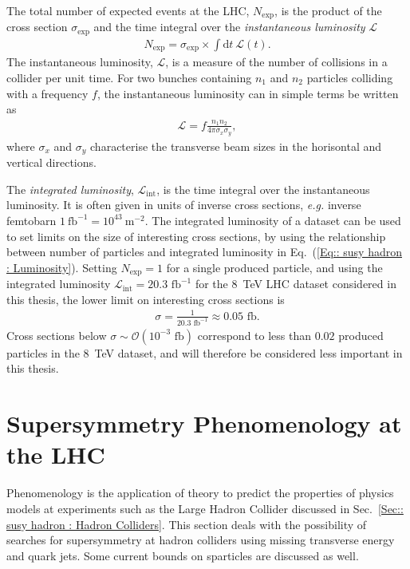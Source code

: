 \documentclass[twoside,english]{uiofysmaster}
\begin{document}
{The total number of expected events at the LHC, $N_{\mathrm{exp}}$, is the product of the cross section $\sigma_{\mathrm{exp}}$ and the time integral over the \textit{instantaneous luminosity} $\mathscr{L}$
\begin{align}\label{Eq:: susy hadron : Luminosity}
N_{\mathrm{exp}} = \sigma_{\mathrm{exp}} \times \int \mathrm{d}t~ \mathscr{L}(t).
\end{align}
The instantaneous luminosity, $\mathscr{L}$, is a measure of the number of collisions in a collider per unit time. For two bunches containing $n_1$ and $n_2$ particles colliding with a frequency $f$, the instantaneous luminosity can in simple terms be written as
\begin{align}
\mathscr{L} = f \frac{n_1 n_2}{4 \pi \sigma_x \sigma_y},
\end{align}
where $\sigma_x$ and $\sigma_y$ characterise the transverse beam sizes in the horisontal and vertical directions.

The \textit{integrated luminosity}, $\mathscr{L}_{\mathrm{int}}$, is the time integral over the instantaneous luminosity. It is often given in units of inverse cross sections, \textit{e.g.} inverse femtobarn $1~\mathrm{fb}^{-1} = 10^{43}~\mathrm{m}^{-2}$. The integrated luminosity of a dataset can be used to set limits on the size of interesting cross sections, by using the relationship between number of particles and integrated luminosity in Eq.~(\ref{Eq:: susy hadron : Luminosity}). Setting $N_{\mathrm{exp}}=1$ for a single produced particle, and using the integrated luminosity $\mathscr{L}_{\mathrm{int}} = 20.3 \text{ fb}^{-1}$ for the 8~TeV LHC dataset considered in this thesis, the lower limit on interesting cross sections is
\begin{align}
\sigma  = \frac{1}{20.3 \text{ fb}^{-1}} \approx 0.05 \text{ fb}.
\end{align}
Cross sections below $\sigma \sim \mathcal{O}(10^{-3} \text{ fb})$ correspond to less than $0.02$ produced particles in the 8~TeV dataset, and will therefore be considered less important in this thesis. 




\section{Supersymmetry Phenomenology at the LHC}

Phenomenology is the application of theory to predict the properties of physics models at experiments such as the Large Hadron Collider discussed in Sec.~\ref{Sec:: susy hadron : Hadron Colliders}. This section deals with the possibility of searches for supersymmetry at hadron colliders using missing transverse energy and quark jets. Some current bounds on sparticles are discussed as well.

}
\end{document}
